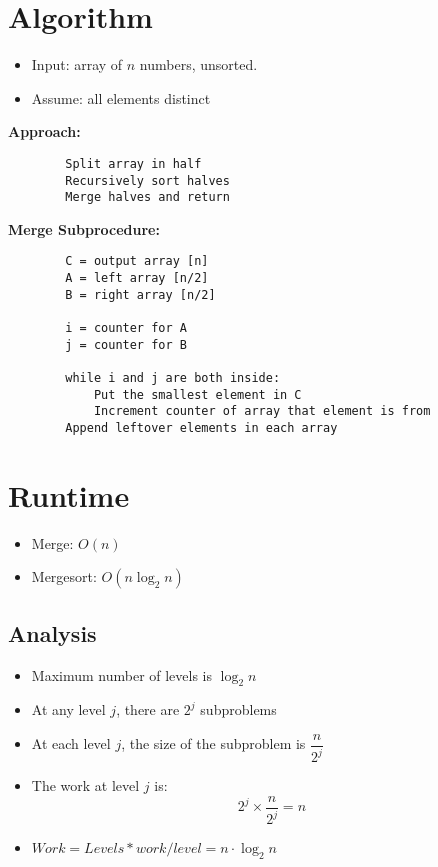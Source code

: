 \documentclass[11pt]{article}
\begin{document}
\section{Algorithm}
	\begin{itemize}
		\itemsep=-2pt
		\item Input: array of $n$ numbers, unsorted.
		\item Assume: all elements distinct
	\end{itemize}
	
	\textbf{Approach:}
	\begin{lstlisting}
		Split array in half
		Recursively sort halves
		Merge halves and return
	\end{lstlisting}
	
	\textbf{Merge Subprocedure:}
	\begin{lstlisting}
		C = output array [n]
		A = left array [n/2]
		B = right array [n/2]
		
		i = counter for A
		j = counter for B
		
		while i and j are both inside:
			Put the smallest element in C
			Increment counter of array that element is from
		Append leftover elements in each array
	\end{lstlisting}
		
\section{Runtime}
	\begin{itemize}
		\itemsep=-2pt
		\item Merge: $O(n)$
		\item Mergesort: $O(n\log_2 n)$
	\end{itemize}
	
	\subsection{Analysis}
		\begin{itemize}
			\item Maximum number of levels is $\log_2 n$
			\item At any level $j$, there are $2^j$ subproblems
			\item At each level $j$, the size of the subproblem is $\dfrac{n}{2^j}$
			\item The work at level $j$ is:
				\begin{equation}
				2^j \times \frac{n}{2^j} = n
				\end{equation}
			\item $Work = Levels * work/level = n \cdot \log_2 n$
		\end{itemize}
		
\end{document}
